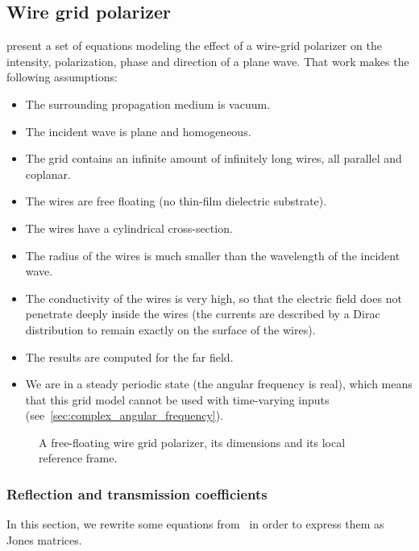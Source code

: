 \subsection{Wire grid polarizer}
\label{sec:wire_grid_polarizer}
\Textcite{houde_2001} present a set of equations modeling the effect of a wire-grid polarizer on the intensity, polarization, phase and direction of a plane wave.
That work makes the following assumptions:
\begin{itemize}[noitemsep]
    \item The surrounding propagation medium is vacuum.
    \item The incident wave is plane and homogeneous.
    \item The grid contains an infinite amount of infinitely long wires, all parallel and coplanar.
    \item The wires are free floating (no thin-film dielectric substrate).
    \item The wires have a cylindrical cross-section.
    \item The radius of the wires is much smaller than the wavelength of the incident wave.
    \item The conductivity of the wires is very high, so that the electric field does not penetrate deeply inside the wires (the currents are described by a Dirac distribution to remain exactly on the surface of the wires).
    \item The results are computed for the far field.
    \item We are in a steady periodic state (the angular frequency is real), which means that this grid model cannot be used with time-varying inputs (see~\cref{sec:complex_angular_frequency}).
\end{itemize}

\begin{figure}
    \centering
    \footnotesize
    
    \caption{A free-floating wire grid polarizer, its dimensions and its local reference frame.}
    \label{fig:grid}
\end{figure}

\subsubsection{Reflection and transmission coefficients}
In this section, we rewrite some equations from~\textcite{houde_2001} in order to express them as Jones matrices.

